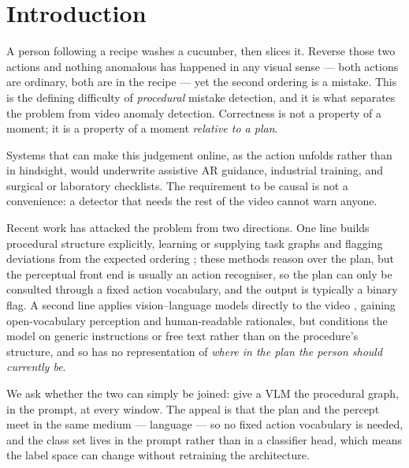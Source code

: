 \documentclass[10pt,twocolumn]{article}
\begin{document}
\section{Introduction}

A person following a recipe washes a cucumber, then slices it. Reverse those two
actions and nothing anomalous has happened in any visual sense --- both actions
are ordinary, both are in the recipe --- yet the second ordering is a mistake.
This is the defining difficulty of \emph{procedural} mistake detection, and it
is what separates the problem from video anomaly detection. Correctness is not a
property of a moment; it is a property of a moment \emph{relative to a plan}.

Systems that can make this judgement online, as the action unfolds rather than
in hindsight, would underwrite assistive AR guidance, industrial training, and
surgical or laboratory checklists. The requirement to be causal is not a
convenience: a detector that needs the rest of the video cannot warn anyone.

Recent work has attacked the problem from two directions. One line builds
procedural structure explicitly, learning or supplying task graphs and flagging
deviations from the expected ordering
\citep{flaborea2024prego,seminara2024taskgraph,lee2024egoper}; these methods
reason over the plan, but the perceptual front end is usually an action
recogniser, so the plan can only be consulted through a fixed action vocabulary,
and the output is typically a binary flag. A second line applies vision--language
models directly to the video \citep{storks2025transparent,spurio2026posttraining},
gaining open-vocabulary perception and human-readable rationales, but conditions
the model on generic instructions or free text rather than on the procedure's
structure, and so has no representation of \emph{where in the plan the person
should currently be}.

We ask whether the two can simply be joined: give a VLM the procedural graph, in
the prompt, at every window. The appeal is that the plan and the percept meet in
the same medium --- language --- so no fixed action vocabulary is needed, and the
class set lives in the prompt rather than in a classifier head, which means the
label space can change without retraining the architecture.
\end{document}
